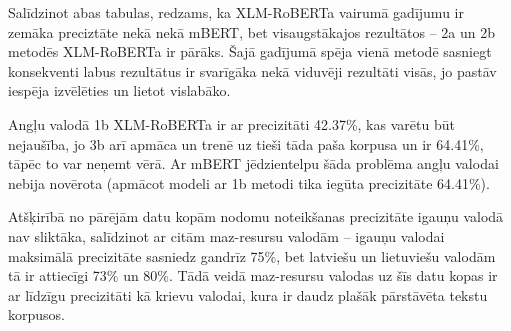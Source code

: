 



Salīdzinot abas tabulas, redzams, ka XLM-RoBERTa vairumā gadījumu ir zemāka preciztāte nekā nekā mBERT, bet visaugstākajos rezultātos -- 2a un 2b metodēs XLM-RoBERTa ir pārāks. Šajā gadījumā spēja vienā metodē sasniegt konsekventi labus rezultātus ir svarīgāka nekā viduvēji rezultāti visās, jo pastāv iespēja izvēlēties un lietot vislabāko.

Angļu valodā 1b XLM-RoBERTa ir ar precizitāti 42.37\%, kas varētu būt nejaušība, jo 3b arī apmāca un trenē uz tieši tāda paša korpusa un ir 64.41\%, tāpēc to var neņemt vērā. Ar mBERT jēdzientelpu šāda problēma angļu valodai nebija novērota (apmācot modeli ar 1b metodi tika iegūta precizitāte 64.41\%).

Atšķirībā no pārējām datu kopām nodomu noteikšanas precizitāte igauņu valodā nav sliktāka, salīdzinot ar citām maz-resursu valodām -- igauņu valodai maksimālā precizitāte sasniedz gandrīz 75\%, bet latviešu un lietuviešu valodām tā ir attiecīgi 73\% un 80\%. Tādā veidā maz-resursu valodas uz šīs datu kopas ir ar līdzīgu precizitāti kā krievu valodai, kura ir daudz plašāk pārstāvēta tekstu korpusos.







